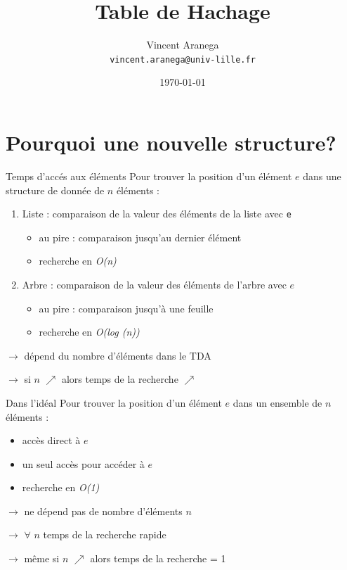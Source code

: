 \documentclass{beamer}
\title[Short Paper Title]{Table de Hachage}
\author{Vincent Aranega\\\texttt{vincent.aranega@univ-lille.fr}}
\date{\today}
\begin{document}
  \maketitle

  \section{Pourquoi une nouvelle structure\@?}
  \begin{frame}{Temps d'accés aux éléments}
    Pour trouver la position d’un élément $e$ dans une structure de donnée de $n$ éléments :
    \begin{enumerate}
      \item{Liste : comparaison de la valeur des éléments de la liste
      avec \texttt{e}}
      \begin{itemize}
        \item{au pire : comparaison jusqu’au dernier élément}
        \item{recherche en \textit{O(n)}}
      \end{itemize}
      \item{Arbre : comparaison de la valeur des éléments de l’arbre avec $e$}
      \begin{itemize}
        \item{au pire : comparaison jusqu’à une feuille}
        \item{recherche en \textit{O(log (n))}}
      \end{itemize}
    \end{enumerate}

  $\rightarrow$ dépend du nombre d’éléments dans le TDA

  $\rightarrow$ si $n$ $\nearrow$ alors temps de la recherche $\nearrow$

  \end{frame}

  \begin{frame}{Dans l'idéal}
    Pour trouver la position d’un élément $e$ dans un ensemble de $n$ éléments :
    \begin{itemize}
      \item{accès direct à $e$}
      \item{un seul accès pour accéder à $e$}
      \item{recherche en \textit{O(1)}}
    \end{itemize}

    $\rightarrow$ ne dépend pas de nombre d’éléments $n$

    $\rightarrow$ $\forall$ $n$ temps de la recherche rapide

    $\rightarrow$ même si $n$ $\nearrow$ alors temps de la recherche = 1
  \end{frame}
\end{document}
